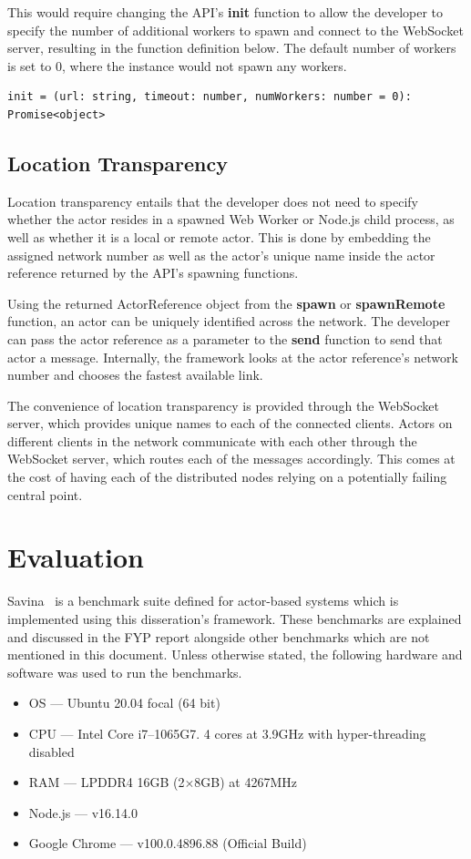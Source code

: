 \documentclass[lettersize,journal]{IEEEtran}
\begin{document}
This would require changing the API's \textbf{init} function to allow the developer to specify the number of additional workers to spawn and connect to the WebSocket server, resulting in the function definition below. The default number of workers is set to 0, where the instance would not spawn any workers.
\begin{lstlisting}
init = (url: string, timeout: number, numWorkers: number = 0): Promise<object>
\end{lstlisting}

\subsection{Location Transparency}
Location transparency entails that the developer does not need to specify whether the actor resides in a spawned Web Worker or Node.js child process, as well as whether it is a local or remote actor. This is done by embedding the assigned network number as well as the actor's unique name inside the actor reference returned by the API's spawning functions.

Using the returned ActorReference object from the \textbf{spawn} or \textbf{spawnRemote} function, an actor can be uniquely identified across the network. The developer can pass the actor reference as a parameter to the \textbf{send} function to send that actor a message. Internally, the framework looks at the actor reference's network number and chooses the fastest available link.

The convenience of location transparency is provided through the WebSocket server, which provides unique names to each of the connected clients. Actors on different clients in the network communicate with each other through the WebSocket server, which routes each of the messages accordingly. This comes at the cost of having each of the distributed nodes relying on a potentially failing central point.
\section{Evaluation}
Savina~\cite{savina} is a benchmark suite defined for actor-based systems which is implemented using this disseration's framework. These benchmarks are explained and discussed in the FYP report alongside other benchmarks which are not mentioned in this document. Unless otherwise stated, the following hardware and software was used to run the benchmarks.
\begin{itemize}
    \item OS --- Ubuntu 20.04 focal (64 bit)
    \item CPU --- Intel Core i7--1065G7. 4 cores at 3.9GHz with hyper-threading disabled
    \item RAM --- LPDDR4 16GB (2$\times$8GB) at 4267MHz
    \item Node.js --- v16.14.0
    \item Google Chrome --- v100.0.4896.88 (Official Build)
\end{itemize}
\end{document}
